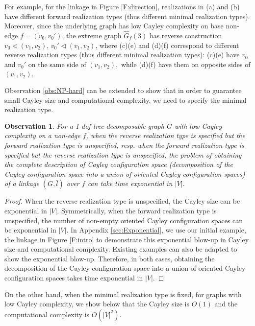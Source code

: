 \documentclass[secthm,amsthm,english]{article}
\newtheorem{observation}{Observation}
\theoremstyle{definition}
\theoremstyle{remark}
\begin{document}
For example,  for the linkage in Figure \ref{F:direction},  
realizations in (a) and (b) have different forward realization types (thus different minimal realization types). 
Moreover,  since the underlying graph has low Cayley complexity on base non-edge $f=(v_{0},v_{0}')$, 
the extreme graph $\hat{G}_{f}(3)$ has reverse construction $v_{0}\triangleleft(v_{1},v_{2})$, $v_{0}'\triangleleft(v_{1},v_{2})$,  
where (c)(e) and (d)(f) correspond to different reverse  realization types (thus different minimal realization types):
(c)(e) have $v_{0}$ and $v_{0}'$ on the same side of $(v_{1},v_{2}),$
while (d)(f) have them on opposite sides of $(v_{1},v_{2})$. 

\medskip

Observation \ref{obs:NP-hard} can be extended to show that in order
to guarantee small Cayley size and computational complexity, we need to specify the minimal realization type.

\begin{observation} \label{obs: no-orientation}
For a 1-dof tree-decomposable graph $G$ with low Cayley complexity on a non-edge $f$, 
when the reverse realization type is specified but the forward realization type is unspecified, 
resp. when the forward realization type is specified but the reverse realization type is unspecified, 
the problem of obtaining the complete description of Cayley configuration space
(decomposition of the Cayley configuration space into a union of oriented Cayley configuration spaces)
of a linkage $(G, \bar{l})$ over $f$ can take time exponential  in $|V|$.
\end{observation}

\begin{proof}
When the reverse realization type is unspecified, the Cayley size can be exponential in $|V|$.
Symmetrically, when the forward realization type is unspecified, 
the number of non-empty oriented Cayley configuration spaces can be exponential in $|V|$. 
In Appendix \ref{sec:Exponential}, we use our initial example, the linkage in Figure \ref{F:intro} 
to demonstrate this exponential blow-up in Cayley size and computational complexity.
Existing examples \cite{bib:Borcea} can also be adapted to show the exponential blow-up. 
Therefore, in both cases, 
obtaining the decomposition of the Cayley configuration space into a union of oriented Cayley configuration spaces
takes time exponential  in $|V|$.
\end{proof}


On the other hand, when the minimal realization type is fixed, for graphs with low Cayley complexity, 
we show below that the Cayley size is $O(1)$ and the computational complexity is $O(|V|^2)$.
\end{document}
